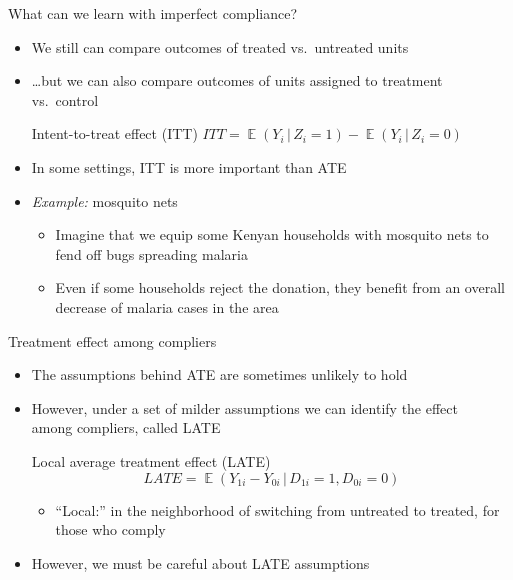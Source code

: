 \documentclass[aspectratio=169,compress,handout,t,xcolor=table]{beamer}
\DeclareMathOperator{\E}{\mathbb{E}}                       %
\begin{document}
\begin{frame}{What can we learn with imperfect compliance?}
  \begin{itemize}
    \item We still can compare outcomes of treated vs.\ untreated units
    \item \ldots but we can also compare outcomes of units assigned to treatment vs.\ control
    \begin{block}{Intent-to-treat effect (ITT)}
      \(ITT = \E(Y_{i} \,|\, Z_i=1) - \E(Y_i \,|\, Z_i=0)\)
    \end{block}
    \item In some settings, ITT is more important than ATE
    \item \emph{Example:} mosquito nets \citep*[inspired by][QJE]{Cohen2010}
    \begin{itemize}
      \item Imagine that we equip some Kenyan households with mosquito nets to fend off bugs spreading malaria
      \item Even if some households reject the donation, they benefit from an overall decrease of malaria cases in the area
    \end{itemize}
  \end{itemize}
\end{frame}

\begin{frame}{Treatment effect among compliers}
  \begin{itemize}
    \item The assumptions behind ATE are sometimes unlikely to hold
    \item However, under a set of milder assumptions we can identify the effect \\ among compliers, called LATE
    \begin{block}{Local average treatment effect (LATE)}
      \begin{equation*}
        LATE = \E(Y_{1i} - Y_{0i} \,|\, D_{1i}=1, D_{0i}=0)
      \end{equation*}
    \end{block}
    \begin{itemize}
      \item ``Local:'' in the neighborhood of switching from untreated to treated, for those who comply
    \end{itemize}
    \item However, we must be careful about LATE assumptions
  \end{itemize}
\end{frame}
\end{document}
